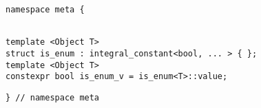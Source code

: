 
\begin{verbatim}
namespace meta {
\end{verbatim}
\begin{verbatim}

template <Object T>
struct is_enum : integral_constant<bool, ... > { };
template <Object T>
constexpr bool is_enum_v = is_enum<T>::value;

\end{verbatim}
\begin{verbatim}
} // namespace meta
\end{verbatim}
